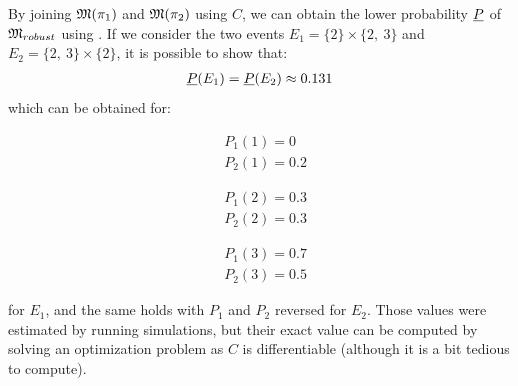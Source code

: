 \begin{example}
By joining $\mathfrak{M}(\pi_1)$ and $\mathfrak{M}(\pi_2)$ using $C$, we can obtain the lower probability $\underline{P}$ of $\mathfrak{M}_{robust}$ using . If we consider the two events $E_1=\{2\}\times\{2,~3\}$ and $E_2=\{2,~3\}\times\{2\}$, it is possible to show that:
\begin{align*}
    \underline{P}(E_1)=\underline{P}(E_2)\approx0.131
\end{align*}
which can be obtained for:\newline\medskip
\begin{minipage}{0.33\textwidth}
    \begin{align*}
        &P_1(1)=0\\
        &P_2(1)=0.2
    \end{align*}
\end{minipage}\hfill
\begin{minipage}{0.33\textwidth}
    \begin{align*}
        &P_1(2)=0.3\\
        &P_2(2)=0.3
    \end{align*}
\end{minipage}\hfill
\begin{minipage}{0.33\textwidth}
    \begin{align*}
         &P_1(3)=0.7\\
         &P_2(3)=0.5
    \end{align*}
\end{minipage}\bigskip\newline
for $E_1$, and the same holds with $P_1$ and $P_2$ reversed for $E_2$. Those values were estimated by running simulations, but their exact value can be computed by solving an optimization problem as $C$ is differentiable (although it is a bit tedious to compute). 


\end{example}
